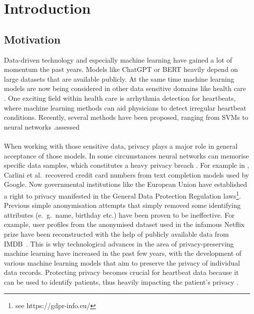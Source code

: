 \section{Introduction}

\subsection{Motivation}

Data-driven technology and especially machine learning have gained a lot of momentum the past years. Models like ChatGPT or BERT heavily depend on large datasets that are available publicly. At the same time machine learning models are now being considered in other data sensitive domains like health care \parencite[see][]{ai_and_med,aimed2,aimed3,aimed4}. One exciting field within health care is arrhythmia detection for heartbeats, where machine learning methods can aid physicians to detect irregular heartbeat conditions. Recently, several methods have been proposed, ranging from SVMs to neural networks \parencite[see review][]{arr_rev}.assessed

\paragraph{}
When working with those sensitive data, privacy plays a major role in general acceptance of those models. In some circumstances neural networks can memorise specific data samples, which constitutes a heavy privacy breach \Parencite[see][]{feldman2021does}. For example in \Parencite{carlini19}, Carlini et al.\ recovered credit card numbers from text completion models used by Google. Now governmental institutions like the European Union have established a right to privacy manifested in the General Data Protection Regulation laws\footnote[1]{see https://gdpr-info.eu/}. Previous simple anonymisation attempts that simply removed some identifying attributes (e.\ g.\ name, birthday etc.) have been proven to be ineffective. For example, user profiles from the anonymised dataset used in the infamous Netflix prize have been reconstructed with the help of publicly available data from IMDB~\cite{4531148}. This is why technological advances in the area of privacy-preserving machine learning have increased in the past few years, with the development of various machine learning models that aim to preserve the privacy of individual data records. Protecting privacy becomes crucial for heartbeat data because it can be used to identify patients, thus heavily impacting the patient's privacy \parencite[see heartbeat biometrics][]{heartb_auth,hegde2011heartbeat}.

